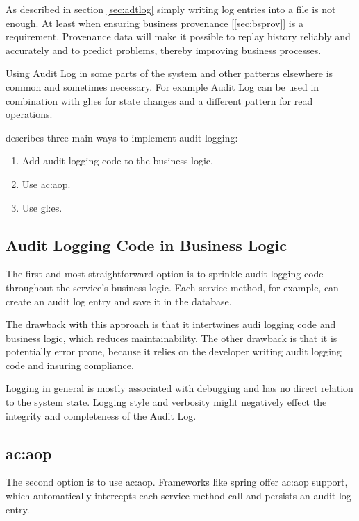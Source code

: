 As described in section \ref{sec:adtlog} simply writing log entries into a file is not enough. At least when ensuring business provenance [\ref{sec:bsprov}] is a requirement. Provenance data will make it possible to replay history reliably and accurately and to predict problems, thereby improving business processes.

Using Audit Log in some parts of the system and other patterns elsewhere is common and sometimes necessary. For example Audit Log can be used in combination with \gls{gl:es} for state changes and a different pattern for read operations.

\citep{richardson2018microservices} describes three main ways to implement audit logging:

\begin{enumerate}
  \item Add audit logging code to the business logic.
  \item Use \gls{ac:aop}.
  \item Use \gls{gl:es}.
\end{enumerate}

\subsection{Audit Logging Code in Business Logic}

The first and most straightforward option is to sprinkle audit logging code throughout the service’s business logic. Each service method, for example, can create an audit log entry and save it in the database. 

The drawback with this approach is that it intertwines audi logging code and business logic, which reduces maintainability.
The other drawback is that it is potentially error prone, because it relies on the developer writing audit logging code and insuring compliance.

Logging in general is mostly associated with debugging and has no direct relation to the system state. Logging style and verbosity might negatively effect the integrity and completeness of the Audit Log.

\subsection{\acrlong{ac:aop}}

The second option is to use \gls{ac:aop}. Frameworks like spring offer \gls{ac:aop} support, which automatically intercepts each service method call and persists an audit log entry.

